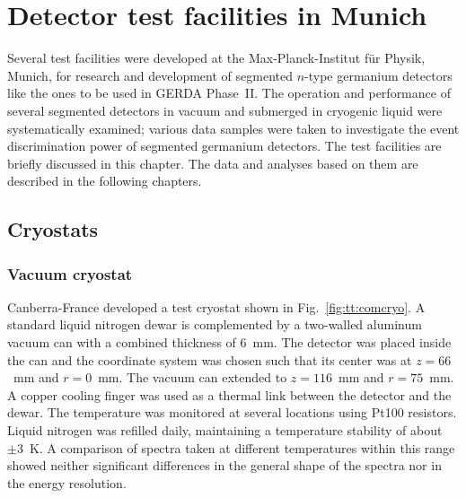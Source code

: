\chapter{Detector test facilities in Munich}
\label{cha:teststand}
Several test facilities were developed at the Max-Planck-Institut f\"ur Physik, Munich, for research and development of segmented $n$-type germanium detectors like the ones to be used in GERDA Phase~II. The operation and performance of several segmented detectors in vacuum and submerged in cryogenic liquid were systematically examined; various data samples were taken to investigate the event discrimination power of segmented germanium detectors. The test facilities are briefly discussed in this chapter. The data and analyses based on them are described in the following chapters.

\section{Cryostats}
\label{sec:tt:cryo}

\subsection{Vacuum cryostat}
\label{sec:tt:comc}
Canberra-France developed a test cryostat shown in Fig.~\ref{fig:tt:comcryo}. A standard liquid nitrogen dewar is complemented by a two-walled aluminum vacuum can with a combined thickness of 6~mm. The detector was placed inside the can and the coordinate system was chosen such that its center was at $z=66$~mm and $r=0$~mm. The vacuum can extended to $z=116$~mm and $r=75$~mm. A copper cooling finger was used as a thermal link between the detector and the dewar. The temperature was monitored at several locations using Pt100 resistors. Liquid nitrogen was refilled daily, maintaining a temperature stability of about $\pm3$~K. A comparison of spectra taken at different temperatures within this range showed neither significant differences in the general shape of the spectra nor in the energy resolution.

